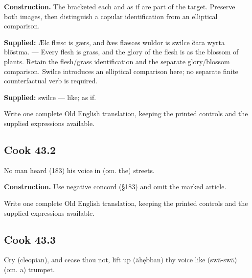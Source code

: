 \textbf{Construction.} The bracketed each and as if are part of the target. Preserve both images, then distinguish a copular identification from an elliptical comparison.

\textbf{Supplied:} Ǣlc flǣsc is gærs, and ðæs flǣsces wuldor is swilce ðāra wyrta blōstma. — Every flesh is grass, and the glory of the flesh is as the blossom of plants. Retain the flesh/\allowbreak{}grass identification and the separate glory/\allowbreak{}blossom comparison. Swilce introduces an elliptical comparison here; no separate finite counterfactual verb is required.

\textbf{Supplied:} swilce — like; as if.

Write one complete Old English translation, keeping the printed controls and the supplied expressions available.

\par\begin{minipage}{\linewidth}\raggedright
\subsection*{Cook 43.2}

No man heard (183) his voice in (om. the) streets.

\textbf{Construction.} Use negative concord (§183) and omit the marked article.

Write one complete Old English translation, keeping the printed controls and the supplied expressions available.

\end{minipage}\par\addvspace{4pt}

\par\begin{minipage}{\linewidth}\raggedright
\subsection*{Cook 43.3}

Cry (cleopian), and cease thou not, lift up (āhębban) thy voice like (swā-swā) (om. a) trumpet.

\end{minipage}\par\addvspace{4pt}

